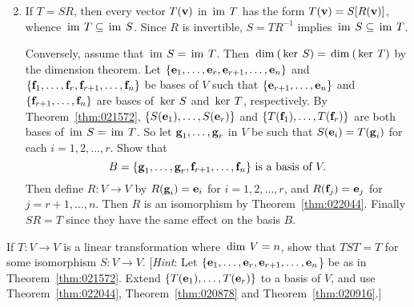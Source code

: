 \begin{multicols}{2}
\begin{ex}
\begin{enumerate}[label={\alph*.}]
\end{enumerate}
\begin{sol}
\begin{enumerate}[label={\alph*.}]
\setcounter{enumi}{1}
\item If $T = SR$, then every vector $T(\textbf{v})$ in $\thinspace\operatorname{im \medspace}T$ has the form $T(\textbf{v}) = S[R(\textbf{v})]$, whence $\thinspace\operatorname{im \medspace}T \subseteq \thinspace\operatorname{im \medspace}S$. Since $R$ is invertible, $S = TR^{-1}$ implies $\thinspace\operatorname{im \medspace}S \subseteq \thinspace\operatorname{im \medspace}T$. 

Conversely, assume that $\thinspace\operatorname{im \medspace}S = \thinspace\operatorname{im \medspace}T$. Then $\thinspace\operatorname{dim\medspace}(\thinspace\operatorname{ker \medspace}S) = \thinspace\operatorname{dim\medspace}(\thinspace\operatorname{ker \medspace}T)$ by the dimension theorem. Let $\{\textbf{e}_{1}, \dots, \textbf{e}_{r}, \textbf{e}_{r+1}, \dots, \textbf{e}_{n}\}$ and $\{\textbf{f}_{1}, \dots, \textbf{f}_{r}, \textbf{f}_{r+1}, \dots, \textbf{f}_{n}\}$ be bases of $V$ such that $\{\textbf{e}_{r+1}, \dots, \textbf{e}_{n}\}$ and $\{\textbf{f}_{r+1}, \dots, \textbf{f}_{n}\}$ are bases of $\thinspace\operatorname{ker \medspace}S$ and $\thinspace\operatorname{ker \medspace}T$, respectively. By Theorem~\ref{thm:021572}, $\{S(\textbf{e}_{1}), \dots, S(\textbf{e}_{r})\}$ and $\{T(\textbf{f}_{1}), \dots, T(\textbf{f}_{r})\}$ are both bases of $\thinspace\operatorname{im \medspace}S = \thinspace\operatorname{im \medspace}T$. So let $\textbf{g}_{1}, \dots, \textbf{g}_{r}$ in $V$ be such that $S(\textbf{e}_{i}) = T(\textbf{g}_{i})$ for each $i = 1, 2, \dots, r$. Show that
\begin{equation*}
B = \{\textbf{g}_1, \dots, \textbf{g}_r, \textbf{f}_{r+1}, \dots, \textbf{f}_n\} \mbox{ is a basis of } V.
\end{equation*}
Then define $R : V \to V$ by $R(\textbf{g}_{i}) = \textbf{e}_{i}$ for $i = 1, 2, \dots, r$, and $R(\textbf{f}_{j}) = \textbf{e}_{j}$ for $j = r + 1, \dots, n$. Then $R$ is an isomorphism by Theorem~\ref{thm:022044}. Finally $SR = T$ since they have the same effect on the basis $B$.
\end{enumerate}
\end{sol}
\end{ex}

\begin{ex}
If $T : V \to V$ is a linear transformation where $\thinspace\operatorname{dim \medspace}V = n$, show that $TST = T$ for some isomorphism $S : V \to V$. [\textit{Hint}: Let $\{\textbf{e}_{1}, \dots, \textbf{e}_{r}, \textbf{e}_{r+1}, \dots, \textbf{e}_{n}$\} be as in Theorem~\ref{thm:021572}. Extend $\{T(\textbf{e}_{1}), \dots, T(\textbf{e}_{r})\}$ to a basis of $V$, and use Theorem~\ref{thm:022044}, Theorem~\ref{thm:020878} and Theorem~\ref{thm:020916}.]


\end{ex}
\end{multicols}
